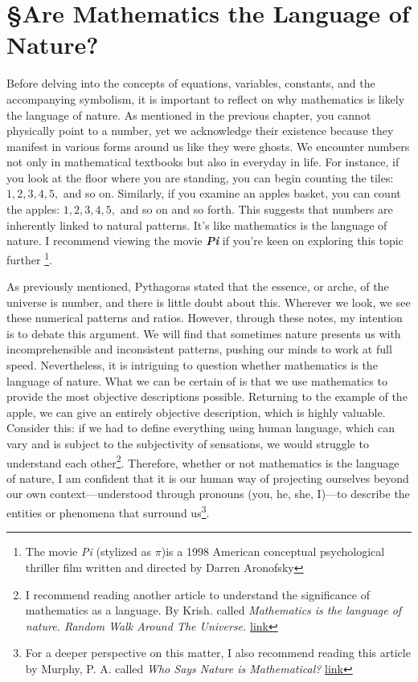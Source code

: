 
\section{\S Are Mathematics the Language of Nature?}
Before delving into the concepts of equations, variables, constants, and the accompanying symbolism, it is important to reflect on why mathematics is likely the language of nature. As mentioned in the previous chapter, you cannot physically point to a number, yet we acknowledge their existence because they manifest in various forms around us like they were ghosts. We encounter numbers not only in mathematical textbooks but also in everyday in life. For instance, if you look at the floor where you are standing, you can begin counting the tiles: $1, 2, 3, 4, 5,$ and so on. Similarly, if you examine an apples basket, you can count the apples: $1, 2, 3, 4, 5,$ and so on and so forth. This suggests that numbers are inherently linked to natural patterns. It's like mathematics is the language of nature. I recommend viewing the movie \textbf{\textit{Pi}} if you're keen on exploring this topic further
\footnote{The movie \textit{Pi} (stylized as $\pi$)is a 1998 American conceptual psychological thriller film written and directed by Darren Aronofsky}.

As previously mentioned, Pythagoras stated that the essence, or arche, of the universe is number, and there is little doubt about this. Wherever we look, we see these numerical patterns and ratios. However, through these notes, my intention is to debate this argument. We will find that sometimes nature presents us with incomprehensible and inconsistent patterns, pushing our minds to work at full speed. Nevertheless, it is intriguing to question whether mathematics is the language of nature. What we can be certain of is that we use mathematics to provide the most objective descriptions possible. Returning to the example of the apple, we can give an entirely objective description, which is highly valuable. Consider this: if we had to define everything using human language, which can vary and is subject to the subjectivity of sensations, we would struggle to understand each other\footnote{I recommend reading another article to understand the significance of mathematics as a language. By Krish. called \textit{Mathematics is the language of nature. Random Walk Around The Universe.} \href{https://medium.com/deciphering-the-future/mathematics-is-the-language-of-nature-11a723b21b17
}{link}}. Therefore, whether or not mathematics is the language of nature, I am confident that it is our human way of projecting ourselves beyond our own context—understood through pronouns (you, he, she, I)—to describe the entities or phenomena that surround us\footnote{For a deeper perspective on this matter, I also recommend reading this article by Murphy, P. A. called \textit{Who Says Nature is Mathematical?} \href{https://www.cantorsparadise.com/who-says-nature-is-mathematical-1abdc1330224}{link}}.

